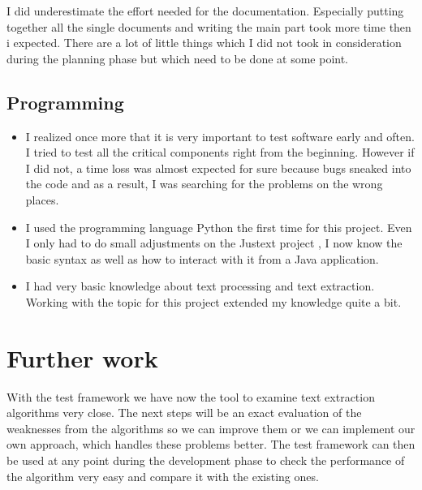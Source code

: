I did underestimate the effort needed for the documentation. Especially putting together all the single documents and writing the main part took more time then i expected. There are a lot of little things which I did not took in consideration during the planning phase but which need to be done at some point.

\subsection{Programming}
\begin{itemize}
\item I realized once more that it is very important to test software early and often. I tried to test all the critical components right from the beginning. However if I did not, a time loss was almost expected for sure because bugs sneaked into the code and as a result, I was searching for the problems on the wrong places. 

\item I used the programming language Python the first time for this project. Even I only had to do small adjustments on the Justext project , I now know the basic syntax as well as how to interact with it from a Java application.

\item I had very basic knowledge about text processing and text extraction. Working with the topic for this project extended my knowledge quite a bit.


\end{itemize}

\section{Further work}

With the test framework we have now the tool to examine text extraction algorithms very close. The next steps will be an exact evaluation of the weaknesses from the algorithms so we can improve them or we can implement our own approach, which handles these problems better. The test framework can then be used at any point during the development phase to check the performance of the algorithm very easy and compare it with the existing ones.  


